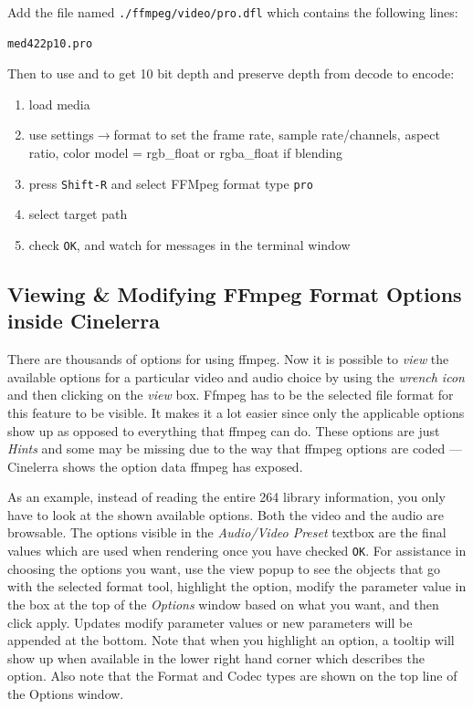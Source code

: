 Add the file named \texttt{./ffmpeg/video/pro.dfl} which contains the following lines:

\begin{lstlisting}[language=bash]
med422p10.pro
\end{lstlisting}

Then to use and to get 10 bit depth and preserve depth from decode to encode:

\begin{enumerate}
    \item load media
    \item use settings$\rightarrow$format to set the frame rate, sample rate/channels, aspect ratio, 
    color model = rgb\_float or rgba\_float if blending
    \item press \texttt{Shift-R} and select FFMpeg format type \texttt{pro}
    \item select target path
    \item check \texttt{OK}, and watch for messages in the terminal window
\end{enumerate}

\subsection{Viewing \& Modifying FFmpeg Format Options inside Cinelerra}%
\label{sub:viewing_modifying_ffmpeg_cinelerra}

There are thousands of options for using ffmpeg.  Now it is possible to \textit{view} the available options for a particular video and audio choice by using the \textit{wrench icon} and then clicking on the \textit{view} box.  Ffmpeg has to be the selected file format for this feature to be visible.  It makes it a lot easier since only the applicable options show up as opposed to everything that ffmpeg can do.  These options are just \textit{Hints} and some may be missing due to the way that ffmpeg options are coded --- Cinelerra shows the option data ffmpeg has exposed.

As an example, instead of reading the entire 264 library information, you only have to look at the shown available options.  Both the video and the audio are browsable. The options visible in the \textit{Audio/Video Preset} textbox are the final values which are used when rendering once you have checked \texttt{OK}.  For assistance in choosing the options you want, use the view popup to see the objects that go with the selected format tool, highlight the option, modify the parameter value in the box at the top of the \textit{Options} window based on what you want, and then click apply.  Updates modify parameter values or new parameters will be appended at the bottom.  Note that when you highlight an option, a tooltip will show up when available in the lower right hand corner which describes the option.  Also note that the Format and Codec types are shown on the top line of the Options window.

